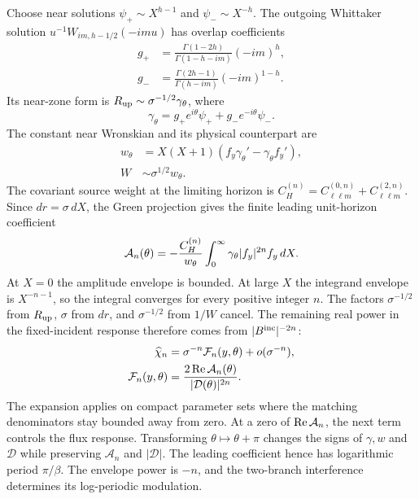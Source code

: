 \documentclass[aps,prd,twocolumn,10pt,nofootinbib,superscriptaddress,floatfix]{revtex4-2}
\begin{document}
Choose near solutions $\psi_+\sim X^{h-1}$ and $\psi_-\sim X^{-h}$.
The outgoing Whittaker solution $u^{-1}W_{im,h-1/2}(-imu)$ has overlap
coefficients
\begin{align}
g_+&=\frac{\Gamma(1-2h)}{\Gamma(1-h-im)}(-im)^h,\nonumber\\
g_-&=\frac{\Gamma(2h-1)}{\Gamma(h-im)}(-im)^{1-h}.
\end{align}
Its near-zone form is $R_{\rm up}\sim\sigma^{-1/2}\gamma_\theta$, where
\begin{equation}
\gamma_\theta=g_+e^{i\theta}\psi_++g_-e^{-i\theta}\psi_-.
\end{equation}
The constant near Wronskian and its physical counterpart are
\begin{align}
w_\theta&=X(X+1)(f_y\gamma_\theta'-\gamma_\theta f_y'),\nonumber\\
W&\sim\sigma^{1/2}w_\theta.
\end{align}
The covariant source weight at the limiting horizon is
$C_H^{(n)}=C^{(0,n)}_{\ell\ell m}+C^{(2,n)}_{\ell\ell m}$.
Since $dr=\sigma\,dX$, the Green projection gives the finite leading
unit-horizon coefficient
\begin{equation}
{\cal A}_n(\theta)=-\frac{C_H^{(n)}}{w_\theta}
\int_0^\infty\gamma_\theta|f_y|^{2n}f_y\,dX.
\label{eq:principal-source-integral}
\end{equation}
At $X=0$ the amplitude envelope is bounded.  At large $X$ the integrand
envelope is $X^{-n-1}$, so the integral converges for every positive integer
$n$.  The factors $\sigma^{-1/2}$ from $R_{\rm up}$, $\sigma$ from $dr$,
and $\sigma^{-1/2}$ from $1/W$ cancel.  The remaining real power in the
fixed-incident response therefore comes from $|B^{\rm inc}|^{-2n}$:
\begin{align}
\widehat\chi_n&=\sigma^{-n}{\cal F}_n(y,\theta)+o(\sigma^{-n}),\nonumber\\
{\cal F}_n(y,\theta)&=\frac{2\operatorname{Re}{\cal A}_n(\theta)}
{|{\cal D}(\theta)|^{2n}}.
\label{eq:principal-law}
\end{align}
The expansion applies on compact parameter sets where the matching
denominators stay bounded away from zero.  At a zero of
$\operatorname{Re}{\cal A}_n$, the next term controls the flux response.
Transforming $\theta\mapsto\theta+\pi$ changes the signs of $\gamma,w$ and
$\mathcal D$ while preserving $\mathcal A_n$ and $|\mathcal D|$.
The leading coefficient hence has logarithmic period $\pi/\beta$.
The envelope power is $-n$, and the two-branch interference determines its
log-periodic modulation.
\end{document}
